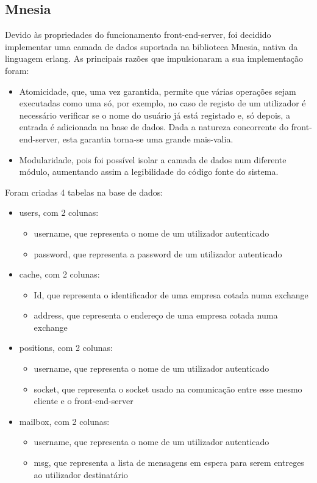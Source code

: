 \documentclass[a4paper,12pt]{article}
\begin{document}
\subsection{Mnesia}
Devido às propriedades do funcionamento front-end-server, foi decidido implementar uma camada de dados suportada na biblioteca Mnesia, nativa da linguagem erlang. As principais razões que impulsionaram a sua implementação foram:
\begin{itemize}
\item Atomicidade, que, uma vez garantida, permite que várias operações sejam executadas como uma só, por exemplo, no caso de registo de um utilizador é necessário verificar se o nome do usuário já está registado e, só depois, a entrada é adicionada na base de dados. Dada a natureza concorrente do front-end-server, esta garantia torna-se uma grande mais-valia.
\item Modularidade, pois foi possível isolar a camada de dados num diferente módulo, aumentando assim a legibilidade do código fonte do sistema.
\end{itemize}
\par Foram criadas 4 tabelas na base de dados:

\begin{itemize}
\item users, com 2 colunas:
  \begin{itemize}
    \item username, que representa o nome de um utilizador autenticado
    \item password, que representa a password de um utilizador autenticado
  \end{itemize}

\item cache, com 2 colunas:
  \begin{itemize}
    \item Id, que representa o identificador de uma empresa cotada numa exchange
    \item address, que representa o endereço de uma empresa cotada numa exchange
  \end{itemize}

\item positions, com 2 colunas:
  \begin{itemize}
    \item username, que representa o nome de um utilizador autenticado
    \item socket, que representa o socket usado na comunicação entre esse mesmo cliente e o front-end-server
  \end{itemize}

\item mailbox, com 2 colunas:
  \begin{itemize}
    \item username, que representa o nome de um utilizador autenticado
    \item msg, que representa a lista de mensagens em espera para serem entreges ao utilizador destinatário
  \end{itemize}
\end{itemize}
\end{document}

